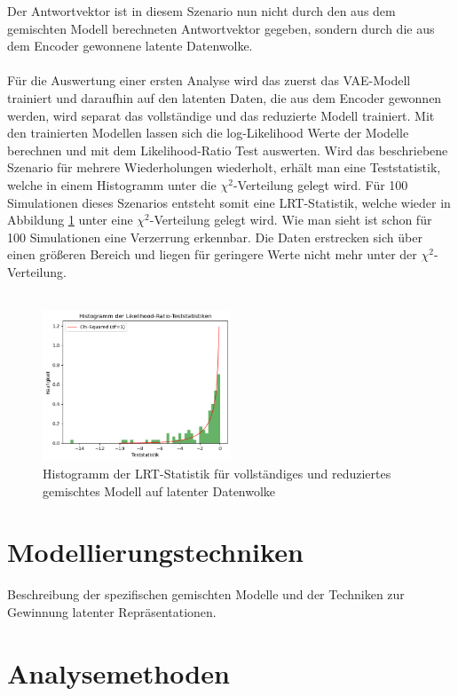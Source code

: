\documentclass[%
thesis=student,%
coverpage=false,%
titlepage=false,%
headmarks=true, %
german,%
font=libertine, %
math=newpxtx, %
BCOR=5mm,%
coverBCOR=11mm%
]{tumbook}
\theoremstyle{break}
\begin{document}
Der Antwortvektor ist in diesem Szenario nun nicht durch den aus dem gemischten Modell berechneten Antwortvektor gegeben, sondern durch die aus dem Encoder gewonnene latente Datenwolke.\\
\\
Für die Auswertung einer ersten Analyse wird das zuerst das VAE-Modell trainiert und daraufhin auf den latenten Daten, die aus dem Encoder gewonnen werden, wird separat das vollständige und das reduzierte Modell trainiert. Mit den trainierten Modellen lassen sich die log-Likelihood Werte der Modelle berechnen und mit dem Likelihood-Ratio Test auswerten. Wird das beschriebene Szenario für mehrere Wiederholungen wiederholt, erhält man eine Teststatistik, welche in einem Histogramm unter die $\chi^2$-Verteilung gelegt wird.
Für 100 Simulationen dieses Szenarios entsteht somit eine LRT-Statistik, welche wieder in Abbildung \ref{fig:LRT_Hist_MM_latentData} unter eine $\chi^2$-Verteilung gelegt wird. Wie man sieht ist schon für 100 Simulationen eine Verzerrung erkennbar. Die Daten erstrecken sich über einen größeren Bereich und liegen für geringere Werte nicht mehr unter der $\chi^2$-Verteilung.\\
\\
\begin{figure}[H]
	\centering
	\includegraphics[width=0.5\textwidth]{plots/VAE_ohneMM_100its_chi2.png}
	\caption{Histogramm der LRT-Statistik für vollständiges und reduziertes gemischtes Modell auf latenter Datenwolke}
	\label{fig:LRT_Hist_MM_latentData}
\end{figure} 

\section{Modellierungstechniken}

Beschreibung der spezifischen gemischten Modelle und der Techniken zur Gewinnung latenter Repräsentationen.
\section{Analysemethoden}
\end{document}
